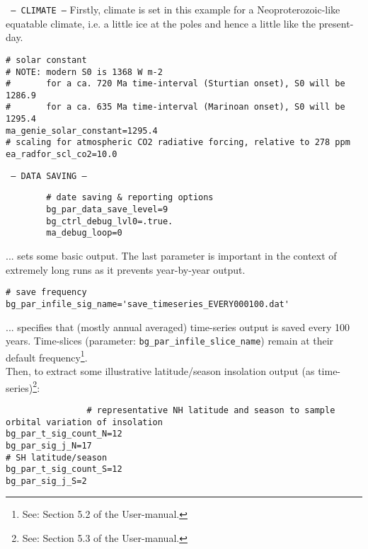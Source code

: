 \documentclass[10pt,twoside]{article}
\begin{document}
\begin{compactitem}

        \item \texttt{ --- CLIMATE ---}
        Firstly, climate is set in this example for a Neoproterozoic-like equatable climate, i.e. a little ice at the poles and hence a little like the present-day.
        \vspace{-5pt}\begin{verbatim}
# solar constant
# NOTE: modern S0 is 1368 W m-2
#       for a ca. 720 Ma time-interval (Sturtian onset), S0 will be 1286.9
#       for a ca. 635 Ma time-interval (Marinoan onset), S0 will be 1295.4
ma_genie_solar_constant=1295.4
# scaling for atmospheric CO2 radiative forcing, relative to 278 ppm
ea_radfor_scl_co2=10.0
                \end{verbatim}\vspace{-5pt}

        \item \texttt{ --- DATA SAVING ---}
        \vspace{-5pt}\begin{verbatim}
        # date saving & reporting options
        bg_par_data_save_level=9
        bg_ctrl_debug_lvl0=.true.
        ma_debug_loop=0
                \end{verbatim}\vspace{-5pt}
                ... sets some basic output. The last parameter is important in the context of extremely long runs as it prevents year-by-year output.
                \vspace{-5pt}\begin{verbatim}
# save frequency
bg_par_infile_sig_name='save_timeseries_EVERY000100.dat'
                \end{verbatim}\vspace{-5pt}
                ... specifies that (mostly annual averaged) time-series output is saved every 100 years. Time-slices (parameter: \texttt{bg\_par\_infile\_slice\_name}) remain at their default frequency\footnote{See: Section 5.2 of the User-manual.}.
                \\ Then, to extract some illustrative latitude/season insolation output (as time-series)\footnote{See: Section 5.3 of the User-manual.}: 
                \vspace{-5pt}\begin{verbatim}
                # representative NH latitude and season to sample orbital variation of insolation
bg_par_t_sig_count_N=12
bg_par_sig_j_N=17
# SH latitude/season
bg_par_t_sig_count_S=12
bg_par_sig_j_S=2
                \end{verbatim}\vspace{-5pt}
                

\end{compactitem}
\end{document}
